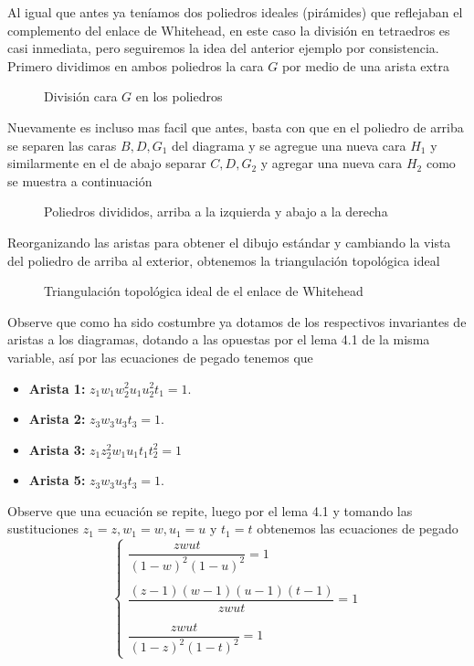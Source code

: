 Al igual que antes ya teníamos dos poliedros ideales (pirámides) que reflejaban el complemento del enlace de Whitehead, en este caso la división en tetraedros es casi inmediata, pero seguiremos la idea del anterior ejemplo por consistencia. Primero dividimos en ambos poliedros la cara $G$ por medio de una arista extra
\begin{figure}[H]
\centering

    \caption{División cara $G$ en los poliedros}
\end{figure}
Nuevamente es incluso mas facil que antes, basta con que en el poliedro de arriba se separen las caras $B,D,G_1$ del diagrama y se agregue una nueva cara $H_1$ y similarmente en el de abajo separar $C,D,G_2$ y agregar una nueva cara $H_2$ como se muestra a continuación
\begin{figure}[H]
\centering

    \caption{Poliedros divididos, arriba a la izquierda y abajo a la derecha}
\end{figure}
Reorganizando las aristas para obtener el dibujo estándar y cambiando la vista del poliedro de arriba al exterior, obtenemos la triangulación topológica ideal
\begin{figure}[H]
\centering

    \caption{Triangulación topológica ideal de el enlace de Whitehead}
\end{figure}
Observe que como ha sido costumbre ya dotamos de los respectivos invariantes de aristas a los diagramas, dotando a las opuestas por el lema 4.1 de la misma variable, así por las ecuaciones de pegado tenemos que
\begin{itemize}
    \item \textbf{Arista 1:} $z_1w_1w_2^2u_1u_2^2t_1=1.$
    \item \textbf{Arista 2:} $z_3w_3u_3t_3=1.$
    \item \textbf{Arista 3:} $z_1z_2^2w_1u_1t_1t_2^2=1$
    \item \textbf{Arista 5:} $z_3w_3u_3t_3=1.$
\end{itemize}
Observe que una ecuación se repite, luego por el lema 4.1 y tomando las sustituciones $z_1=z,w_1=w,u_1=u$ y $t_1=t$ obtenemos las ecuaciones de pegado
$$\begin{cases}
    \dfrac{zwut}{(1-w)^2(1-u)^2}=1\\
    \\
    \dfrac{(z-1)(w-1)(u-1)(t-1)}{zwut}=1\\
    \\
    \dfrac{zwut}{(1-z)^2(1-t)^2}=1
\end{cases}$$
